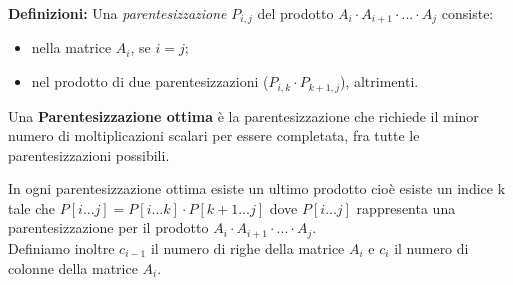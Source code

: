 \documentclass[../cheatSheetAlgoritmi.tex]{subfiles}
\begin{document}
\bigskip

\textbf{Definizioni:} Una \emph{parentesizzazione} $P_{i,j}$ del prodotto $A_i \cdot A_{i+1}\cdot ... \cdot A_j$ consiste:
\begin{itemize}
	\item nella matrice $A_i$, se $i = j$;
	\item nel prodotto di due parentesizzazioni ($P_{i,k} \cdot P_{k+1,j}$), altrimenti.
\end{itemize}
Una \textbf{Parentesizzazione ottima} è la parentesizzazione che richiede il minor numero di moltiplicazioni scalari per essere completata, fra tutte le parentesizzazioni possibili.

In ogni parentesizzazione ottima esiste un ultimo prodotto cioè esiste un indice k tale che $P[i...j] = P[i...k] \cdot P[k+1...j]$ dove $P[i...j]$ rappresenta una parentesizzazione per il prodotto $A_i \cdot A_{i+1} \cdot ... \cdot A_j$.\\
Definiamo inoltre $c_{i-1}$ il numero di righe della matrice $A_i$ e $c_{i}$  il numero di colonne della matrice $A_i$.

\bigskip
\end{document}
